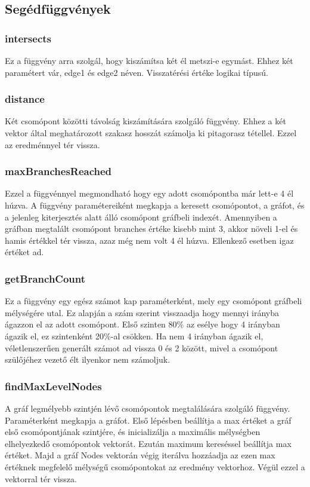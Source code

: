 \subsection{Segédfüggvények}
\subsubsection{intersects}
Ez a függvény arra szolgál, hogy kiszámítsa két él metszi-e egymást. Ehhez két paramétert vár, edge1 és edge2 néven. Visszatérési értéke logikai típusú.
\subsubsection{distance}
Két csomópont közötti távolság kiszámítására szolgáló függvény. Ehhez a két vektor által meghatározott szakasz hosszát számolja ki pitagorasz tétellel. Ezzel az eredménnyel tér vissza.
\subsubsection{maxBranchesReached}
Ezzel a függvénnyel megmondható hogy egy adott csomópontba már lett-e 4 él húzva. A függvény paramétereiként megkapja a keresett csomópontot, a gráfot, és a jelenleg kiterjesztés alatt álló csomópont gráfbeli indexét. Amennyiben a gráfban megtalált csomópont branches értéke kisebb mint 3, akkor növeli 1-el és hamis értékkel tér vissza, azaz még nem volt 4 él húzva. Ellenkező esetben igaz értéket ad.
\subsubsection{getBranchCount}
Ez a függvény egy egész számot kap paraméterként, mely egy csomópont gráfbeli mélységére utal. Ez alapján a szám szerint visszaadja hogy mennyi irányba ágazzon el az adott csomópont. Első szinten 80\% az esélye hogy 4 irányban ágazik el, ez szintenként 20\%-al csökken. Ha nem 4 irányban ágazik el, véletlenszerűen generált számot ad vissza 0 és 2 között, mivel a csomópont szülőjéhez vezető élt ilyenkor nem számoljuk.
\subsubsection{findMaxLevelNodes}
A gráf legmélyebb szintjén lévő csomópontok megtalálására szolgáló függvény. Paraméterként megkapja a gráfot. Első lépésben beállítja a max értéket a gráf első csomópontjának szintjére, és inicializálja a maximális mélységben elhelyezkedő csomópontok vektorát. Ezután maximum kereséssel beállítja max értéket. Majd a gráf Nodes vektorán végig iterálva hozzáadja az ezen max értéknek megfelelő mélységű csomópontokat az eredmény vektorhoz. Végül ezzel a vektorral tér vissza.

